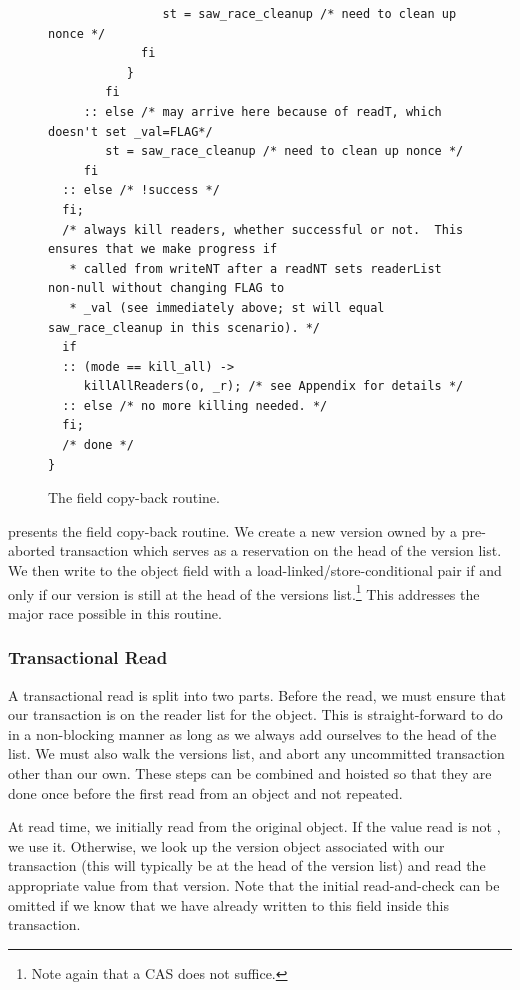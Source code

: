 \begin{figure}
\begin{verbatim}
                st = saw_race_cleanup /* need to clean up nonce */
             fi
           }
        fi
     :: else /* may arrive here because of readT, which doesn't set _val=FLAG*/
        st = saw_race_cleanup /* need to clean up nonce */
     fi
  :: else /* !success */
  fi;
  /* always kill readers, whether successful or not.  This ensures that we make progress if
   * called from writeNT after a readNT sets readerList non-null without changing FLAG to
   * _val (see immediately above; st will equal saw_race_cleanup in this scenario). */
  if
  :: (mode == kill_all) ->
     killAllReaders(o, _r); /* see Appendix for details */
  :: else /* no more killing needed. */
  fi;
  /* done */
}
\end{verbatim}
\caption{The field copy-back routine.}\label{fig:copyback}
\end{figure}
 presents the field copy-back routine.  We create a
new version owned by a pre-aborted transaction which serves as a
reservation on the head of the version list.  We then write to the
object field with a load-linked/store-conditional pair if and only if
our version is still at the head of the versions list.\footnote{Note
  again that a CAS does not suffice.}  This addresses
the major race possible in this routine.

\subsubsection{Transactional Read}\label{sec:readT}
A transactional read is split into two parts.  Before the read, we
must ensure that our transaction is on the reader list for the
object.  This is straight-forward to do in a non-blocking manner as
long as we always add ourselves to the head of the list.  We must also
walk the versions list, and abort any uncommitted transaction other
than our own.  These steps can be combined and hoisted so that they
are done once before the first read from an object and not repeated.

At read time, we initially read from the original object.  If the
value read is not \FLAG, we use it.  Otherwise, we look up the version
object associated with our transaction (this will typically be at the
head of the version list) and read the appropriate value from that
version.  Note that the initial read-and-check can be omitted if we
know that we have already written to this field inside this transaction.

